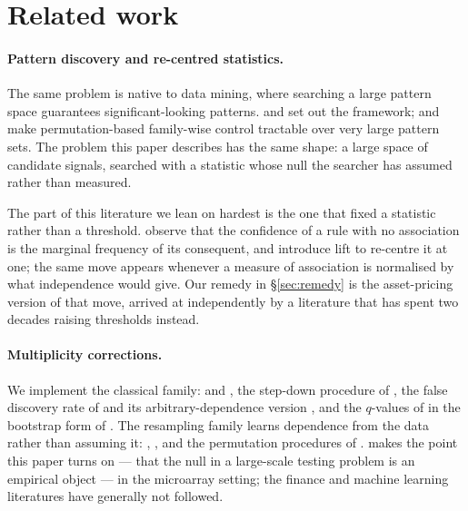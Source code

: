 \documentclass{article}
\begin{document}
\section{Related work}
\label{sec:related}

\paragraph{Pattern discovery and re-centred statistics.}
The same problem is native to data mining, where searching a large pattern space
guarantees significant-looking patterns. \citet{webb2007} and
\citet{hamalainen2019} set out the framework; \citet{terada2013} and
\citet{llinares2015} make permutation-based family-wise control tractable over
very large pattern sets. The problem this paper describes has the same shape:
a large space of candidate signals, searched with a statistic whose null the
searcher has assumed rather than measured.

The part of this literature we lean on hardest is the one that fixed a
statistic rather than a threshold. \citet{brin1997} observe that the confidence
of a rule with no association is the marginal frequency of its consequent, and
introduce lift to re-centre it at one; the same move appears whenever a measure
of association is normalised by what independence would give. Our remedy in
\S\ref{sec:remedy} is the asset-pricing version of that move, arrived at
independently by a literature that has spent two decades raising thresholds
instead.

\paragraph{Multiplicity corrections.}
We implement the classical family: \citet{bonferroni1936} and
\citet{sidak1967}, the step-down procedure of \citet{holm1979}, the false
discovery rate of \citet{benjamini1995} and its arbitrary-dependence version
\citep{benjamini2001}, and the $q$-values of \citet{storey2002} in the
bootstrap form of \citet{storey2004}. The
resampling family learns dependence from the data rather than assuming it:
\citet{white2000}, \citet{hansen2005}, \citet{romano2005} and the permutation
procedures of \citet{westfall1993}. \citet{efron2004} makes the point this paper
turns on --- that the null in a large-scale testing problem is an empirical
object --- in the microarray setting; the finance and machine learning
literatures have generally not followed.
\end{document}
